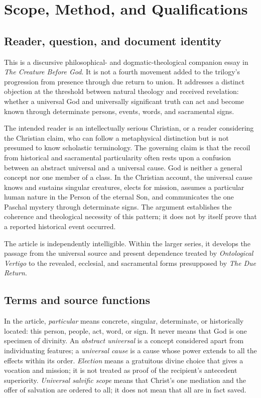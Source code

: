 \section{Scope, Method, and Qualifications}

\subsection{Reader, question, and document identity}

This is a discursive philosophical- and dogmatic-theological companion essay in \emph{The Creature Before God}. It is not a fourth movement added to the trilogy's progression from presence through due return to union. It addresses a distinct objection at the threshold between natural theology and received revelation: whether a universal God and universally significant truth can act and become known through determinate persons, events, words, and sacramental signs.

The intended reader is an intellectually serious Christian, or a reader considering the Christian claim, who can follow a metaphysical distinction but is not presumed to know scholastic terminology. The governing claim is that the recoil from historical and sacramental particularity often rests upon a confusion between an abstract universal and a universal cause. God is neither a general concept nor one member of a class. In the Christian account, the universal cause knows and sustains singular creatures, elects for mission, assumes a particular human nature in the Person of the eternal Son, and communicates the one Paschal mystery through determinate signs. The argument establishes the coherence and theological necessity of this pattern; it does not by itself prove that a reported historical event occurred.

The article is independently intelligible. Within the larger series, it develops the passage from the universal source and present dependence treated by \emph{Ontological Vertigo} to the revealed, ecclesial, and sacramental forms presupposed by \emph{The Due Return}.

\subsection{Terms and source functions}

In the article, \emph{particular} means concrete, singular, determinate, or historically located: this person, people, act, word, or sign. It never means that God is one specimen of divinity. An \emph{abstract universal} is a concept considered apart from individuating features; a \emph{universal cause} is a cause whose power extends to all the effects within its order. \emph{Election} means a gratuitous divine choice that gives a vocation and mission; it is not treated as proof of the recipient's antecedent superiority. \emph{Universal salvific scope} means that Christ's one mediation and the offer of salvation are ordered to all; it does not mean that all are in fact saved.

